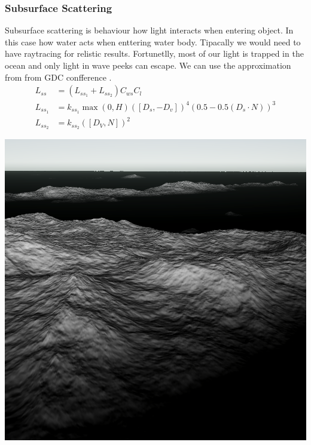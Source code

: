 \subsubsection{Subsurface Scattering}
Subsurface scattering is behaviour how light interacts when entering object. In this case how water acts when enttering water body.
Tipacally we would need to have raytracing for relistic results. Fortunetlly, most of our light is trapped in the ocean and only light in wave peeks can escape. 
We can use the approximation from from GDC confference \cite{mark2021}.
\begin{equation}
    \begin{split}
        L_{ss} &= (L_{ss_1} + L_{ss_2}) C_{ws} C_l\\
        L_{ss_1} &= k_{ss_1} \max(0, H) ([D_s, -D_v])^{4}(0.5-0.5(D_s \cdot N))^{3}\\
        L_{ss_2} &= k_{ss_2} ([D_V, N])^{2}
    \end{split}
\end{equation}
\begin{minipage}{0.32\textwidth}
    \includegraphics[width=1\textwidth]{"images/ss1_light.png"}
    \label{fig:lss1_light}
\end{minipage}
\hfill
